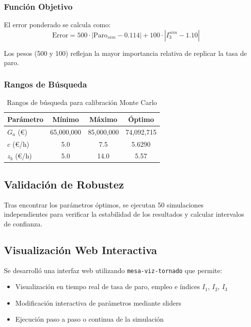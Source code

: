 \subsubsection{Función Objetivo}

El error ponderado se calcula como:
\begin{equation}
\text{Error} = 500 \cdot |\text{Paro}_{sim} - 0.114| + 100 \cdot |I_3^{sim} - 1.10|
\end{equation}

Los pesos (500 y 100) reflejan la mayor importancia relativa de replicar la tasa de paro.

\subsubsection{Rangos de Búsqueda}

\begin{table}[h]
\centering
\caption{Rangos de búsqueda para calibración Monte Carlo}
\begin{tabular}{lccc}
\toprule
\textbf{Parámetro} & \textbf{Mínimo} & \textbf{Máximo} & \textbf{Óptimo} \\
\midrule
$G_a$ (€) & 65,000,000 & 85,000,000 & 74,092,715 \\
$c$ (€/h) & 5.0 & 7.5 & 5.6290 \\
$z_b$ (€/h) & 5.0 & 14.0 & 5.57 \\
\bottomrule
\end{tabular}
\end{table}

\subsection{Validación de Robustez}

Tras encontrar los parámetros óptimos, se ejecutan 50 simulaciones independientes para verificar la estabilidad de los resultados y calcular intervalos de confianza.

\subsection{Visualización Web Interactiva}

Se desarrolló una interfaz web utilizando \texttt{mesa-viz-tornado} que permite:
\begin{itemize}
    \item Visualización en tiempo real de tasa de paro, empleo e índices $I_1$, $I_2$, $I_3$
    \item Modificación interactiva de parámetros mediante sliders
    \item Ejecución paso a paso o continua de la simulación
\end{itemize}

